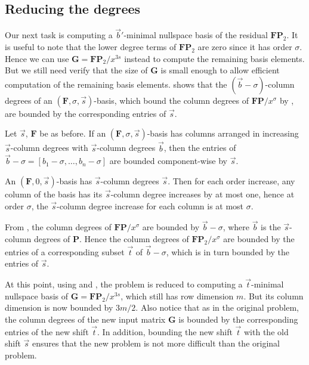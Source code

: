\subsection{Reducing the degrees}

Our next task is computing a $\vec{b}'$-minimal nullspace basis of
the residual $\mathbf{F}\mathbf{P}_{2}$. It is useful to note that
the lower degree terms of $\mathbf{F}\mathbf{P}_{2}$ are zero since
it has order $\sigma$. Hence we can use $\mathbf{G}=\mathbf{F}\mathbf{P}_{2}/x^{3s}$
instead to compute the remaining basis elements. But we still need
verify that the size of $\mathbf{G}$ is small enough to allow efficient
computation of the remaining basis elements. 
shows that the $\left(\vec{b}-\sigma\right)$-column degrees of an
$(\mathbf{F},\sigma,\vec{s})$-basis, which bound the column degrees
of $\mathbf{F}\mathbf{P}/x^{\sigma}$ by ,
are bounded by the corresponding entries of $\vec{s}$.
\begin{lem}
\label{lem:boundOnShiftedDegrees}Let $\vec{s}$, $\mathbf{F}$ be
as before. If an $(\mathbf{F},\sigma,\vec{s})$-basis has columns
arranged in increasing $\vec{s}$-column degrees with $\vec{s}$-column
degrees $\vec{b}$, then the entries of $\vec{b}-\sigma=\left[b_{1}-\sigma,\dots,b_{n}-\sigma\right]$
are bounded component-wise by $\vec{s}$.\end{lem}
\begin{pf}
An $(\mathbf{F},0,\vec{s})$-basis has $\vec{s}$-column degrees $\vec{s}$.
Then for each order increase, any column of the basis has its $\vec{s}$-column
degree increases by at most one, hence at order $\sigma$, the $\vec{s}$-column
degree increase for each column is at most $\sigma$.
\end{pf}
From , the column degrees of $\mathbf{F}\mathbf{P}/x^{\sigma}$
are bounded by $\vec{b}-\sigma$, where $\vec{b}$ is the $\vec{s}$-column
degrees of $\mathbf{P}$. Hence the column degrees of $\mathbf{F}\mathbf{P}_{2}/x^{\sigma}$
are bounded by the entries of a corresponding subset $\vec{t}$ of
$\vec{b}-\sigma$, which is in turn bounded by the entries of $\vec{s}$. 

At this point, using 
and , the problem is reduced
to computing a $\vec{t}$-minimal nullspace basis of $\mathbf{G}=\mathbf{F}\mathbf{P}_{2}/x^{3s}$,
which still has row dimension $m$. But its column dimension is now
bounded by $3m/2$. Also notice that as in the original problem, the
column degrees of the new input matrix $\mathbf{G}$ is bounded by
the corresponding entries of the new shift $\vec{t}$. In addition,
bounding the new shift $\vec{t}$ with the old shift $\vec{s}$ ensures
that the new problem is not more difficult than the original problem. 

